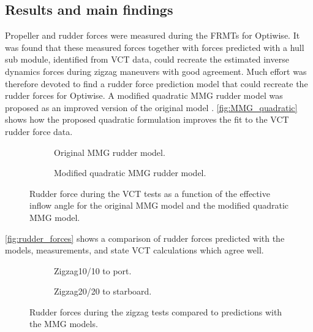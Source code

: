 \subsection*{Results and main findings}
Propeller and rudder forces were measured during the FRMTs for Optiwise. It was found that these measured forces together with forces predicted with a hull sub module, identified from VCT data, could recreate the estimated inverse dynamics forces during zigzag maneuvers with good agreement. Much effort was therefore devoted to find a rudder force prediction model that could recreate the rudder forces for Optiwise. A modified quadratic MMG rudder model was proposed as an improved version of the original model \cite{yasukawaIntroductionMMGStandard2015}. \autoref{fig:MMG_quadratic} shows how the proposed quadratic formulation improves the fit to the VCT rudder force data.  
\begin{figure}[h]
     \centering
     \begin{subfigure}[b]{0.49\textwidth}
         \centering
         
        \caption{Original MMG rudder model.}
        \label{fig:Y_R_MMG_original}
     \end{subfigure}
     \hfill
     \begin{subfigure}[b]{0.49\textwidth}
         \centering
         
        \caption{Modified quadratic MMG rudder model.}
        \label{fig:Y_R_MMG_quadratic}
     \end{subfigure}
    \caption{Rudder force during the VCT tests as a function of the effective inflow angle for the original MMG model and the modified quadratic MMG model.}
    \label{fig:MMG_quadratic}
\end{figure}

\autoref{fig:rudder_forces}  shows a comparison of rudder forces predicted with the models, measurements, and state VCT calculations which agree well. 
\begin{figure}[h]
    \centering
    \begin{subfigure}[b]{\textwidth}
        \centering
        
        \caption{Zigzag10/10 to port.}
        \label{fig:ID_measured_rudder_zigzag_10_10}
    \end{subfigure}
     \vfill
    \begin{subfigure}[b]{\textwidth}
        \centering
        
        \caption{Zigzag20/20 to starboard.}
        \label{fig:ID_measured_rudder_zigzag_20_20}
    \end{subfigure}
    \caption{Rudder forces during the zigzag tests compared to predictions with the MMG models.}
    \label{fig:rudder_forces}
\end{figure}

